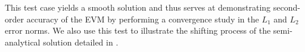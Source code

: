 \documentclass[times,doublespace]{fldauth}%
\begin{document}
This test case yields a smooth solution and thus serves at demonstrating second-order accuracy of the EVM by performing a convergence study in the $L_1$ and $L_2$ error norms. We also use this test to illustrate the shifting process of the semi-analytical solution detailed in .
\end{document}
